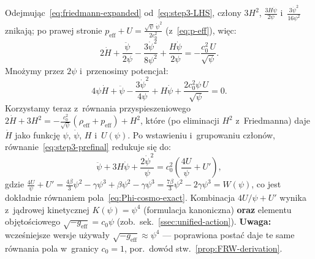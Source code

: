 \begin{remark}
\begin{equation}
\end{equation}
Odejmuj\k{a}c~\eqref{eq:friedmann-expanded}
od~\eqref{eq:step3-LHS}, cz\l{}ony $3H^2$,
$\frac{3H\dot\psi}{2\psi}$ i~$\frac{3\dot\psi^2}{16\psi^2}$
znikaj\k{a}; po prawej stronie
$p_{\mathrm{eff}} + U
= \frac{\sqrt\psi\,\dot\psi^2}{2c_0^2}$
(z~\eqref{eq:p-eff}), wi\k{e}c:
\begin{equation}\label{eq:step3-after-friedmann}
  2\dot H + \frac{\ddot\psi}{2\psi}
  - \frac{3\dot\psi^2}{8\psi^2}
  + \frac{H\dot\psi}{2\psi}
  = -\frac{c_0^2\,U}{\sqrt\psi}.
\end{equation}
Mno\.zymy przez $2\psi$ i~przenosimy potencja\l{}:
\begin{equation}\label{eq:step3-prefinal}
  4\psi\dot H + \ddot\psi
  - \frac{3\dot\psi^2}{4\psi}
  + H\dot\psi
  + \frac{2c_0^2\psi\,U}{\sqrt\psi} = 0.
\end{equation}
Korzystamy teraz z~r\'ownania przyspieszeniowego
$2\dot H + 3H^2 = -\frac{c_0^2}{\sqrt\psi}
(\rho_{\mathrm{eff}} + p_{\mathrm{eff}}) + H^2$,
kt\'ore (po eliminacji $H^2$ z~Friedmanna) daje
$\dot H$ jako funkcj\k{e} $\psi$, $\dot\psi$, $H$
i~$U(\psi)$. Po wstawieniu
i~grupowaniu cz\l{}on\'ow, r\'ownanie~\eqref{eq:step3-prefinal}
redukuje si\k{e} do:
\[
  \ddot\psi + 3H\dot\psi + \frac{2\dot\psi^2}{\psi}
  = c_0^2\!\left(\frac{4U}{\psi} + U'\right),
\]
gdzie
$\frac{4U}{\psi} + U'
= \frac{4\beta}{3}\psi^2 - \gamma\psi^3 + \beta\psi^2 - \gamma\psi^3
= \frac{7\beta}{3}\psi^2 - 2\gamma\psi^3 = W(\psi)$,
co jest dok\l{}adnie r\'ownaniem pola~\eqref{eq:Phi-cosmo-exact}.
Kombinacja $4U/\psi + U'$ wynika z~jądrowej kinetycznej
$K(\psi)=\psi^4$ (formulacja kanoniczna) \textbf{oraz}
elementu objętościowego $\sqrt{-g_{\mathrm{eff}}} = c_0\psi$
(zob.\ sek.~\ref{ssec:unified-action}).
\textbf{Uwaga:} wcześniejsze wersje używały
$\sqrt{-g_{\mathrm{eff}}} \approx \psi^4$ ---
poprawiona postać daje te same r\'ownania pola
w~granicy $c_0 = 1$, por.\ dow\'od stw.~\ref{prop:FRW-derivation}.
\end{remark}

